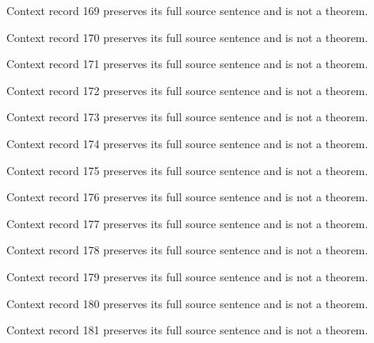 \documentclass{article}
\begin{document}
\begin{remark}\label{train:context:169}Context record 169 preserves its full source sentence and is not a theorem.\end{remark}
\begin{remark}\label{train:context:170}Context record 170 preserves its full source sentence and is not a theorem.\end{remark}
\begin{remark}\label{train:context:171}Context record 171 preserves its full source sentence and is not a theorem.\end{remark}
\begin{remark}\label{train:context:172}Context record 172 preserves its full source sentence and is not a theorem.\end{remark}
\begin{remark}\label{train:context:173}Context record 173 preserves its full source sentence and is not a theorem.\end{remark}
\begin{remark}\label{train:context:174}Context record 174 preserves its full source sentence and is not a theorem.\end{remark}
\begin{remark}\label{train:context:175}Context record 175 preserves its full source sentence and is not a theorem.\end{remark}
\begin{remark}\label{train:context:176}Context record 176 preserves its full source sentence and is not a theorem.\end{remark}
\begin{remark}\label{train:context:177}Context record 177 preserves its full source sentence and is not a theorem.\end{remark}
\begin{remark}\label{train:context:178}Context record 178 preserves its full source sentence and is not a theorem.\end{remark}
\begin{remark}\label{train:context:179}Context record 179 preserves its full source sentence and is not a theorem.\end{remark}
\begin{remark}\label{train:context:180}Context record 180 preserves its full source sentence and is not a theorem.\end{remark}
\begin{remark}\label{train:context:181}Context record 181 preserves its full source sentence and is not a theorem.\end{remark}
\end{document}
